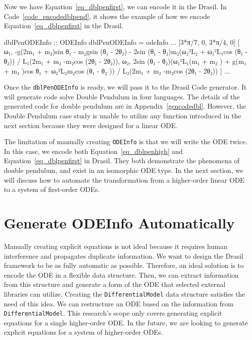 Now we have Equation~\ref{eq_dblpenfirst}, we can encode it in the Drasil. In Code~\ref{code_encodedblpend}, it shows the example of how we encode Equation~\ref{eq_dblpenfirst} in the Drasil. 
\begin{listing}[ht]
\begin{haskell1}
dblPenODEInfo :: ODEInfo
dblPenODEInfo = odeInfo
...
[3*π/7, 0, 3*π/4, 0]
[ ω₁,
  -g(2m₁ + m₂)sin θ₁ - m₂gsin (θ₁ - 2θ₂) - 2sin (θ₁ - θ₂)m₂(ω₂²L₂ + ω₁²L₁cos (θ₁ - θ₂)) / L₁(2m₁ + m₂ -m₂cos (2θ₁ - 2θ₂)),
  ω₂,
  2sin (θ₁ - θ₂)(ω₁²L₁(m₁ + m₂ ) + g(m₁ + m₂ )cos θ₁ + ω₂²L₂m₂cos (θ₁ - θ₂ )) / L₂(2m₁ + m₂ -m₂cos (2θ₁ - 2θ₂))
]
...
\end{haskell1}
\label{code_encodedblpend}
\end{listing}

Once the \verb|dblPenODEInfo| is ready, we will pass it to the Drasil Code generator. It will generate code solve Double Pendulum in four languages. The details of the generated code for double pendulum are in Appendix~\ref{gencodedbl}. However, the Double Pendulum case study is unable to utilize any function introduced in the next section because they were designed for a linear ODE.

The limitation of manually creating \verb|ODEInfo| is that we will write the ODE twice. In this case, we encode both Equation~\ref{eq_dblpenhigh} and Equation~\ref{eq_dblpenfirst} in Drasil. They both demonstrate the phenomena of double pendulum, and exist in an isomorphic ODE type. In the next section, we will discuss how to automate the transformation from a higher-order linear ODE to a system of first-order ODEs.

\section{Generate ODEInfo Automatically}
Manually creating explicit equations is not ideal because it requires human interference and propagates duplicate information. We want to design the Drasil framework to be as fully automatic as possible. Therefore, an ideal solution is to encode the ODE in a flexible data structure. Then, we can extract information from this structure and generate a form of the ODE that selected external libraries can utilize. Creating the \verb|DifferentialModel| data structure satisfies the need of this idea. We can restructure an ODE based on the information from \verb|DifferentialModel|. This research's scope only covers generating explicit equations for a single higher-order ODE. In the future, we are looking to generate explicit equations for a system of higher-order ODEs.

